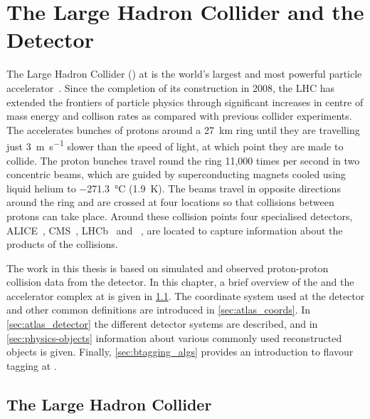 \chapter{The Large Hadron Collider and the \ATLAS Detector}\label{chap:lhc_atlas}

The Large Hadron Collider (\LHC) at \CERN is the world's largest and most powerful particle accelerator~\cite{Evans:2008zzb}.
Since the completion of its construction in 2008, the LHC has extended the frontiers of particle physics through significant increases in centre of mass energy and collison rates as compared with previous collider experiments.
The \LHC accelerates bunches of protons around a \SI{27}{\km} ring until they are travelling just \SI{3}{\m\per\s} slower than the speed of light, at which point they are made to collide.
The proton bunches travel round the ring 11,000 times per second in two concentric beams, which are guided by superconducting magnets cooled using liquid helium to \SI{-271.3}{\degreeCelsius} (\SI{1.9}{\kelvin}).
The beams travel in opposite directions around the ring and are crossed at four locations so that collisions between protons can take place.
Around these collision points four specialised detectors, ALICE~\cite{AliceCollaboration_2008}, CMS~\cite{CMS-TDR-08-001}, LHCb~\cite{LHCbCollaboration_2008} and \ATLAS~\cite{PERF-2007-01}, are located to capture information about the products of the collisions.

The work in this thesis is based on simulated and observed proton-proton collision data from the \ATLAS detector.
In this chapter, a brief overview of the \LHC and the accelerator complex at \CERN is given in \cref{sec:lhc}.
The coordinate system used at the \ATLAS detector and other common definitions are introduced in \cref{sec:atlas_coords}.
In \cref{sec:atlas_detector} the different \ATLAS detector systems are described, and in \cref{sec:physics-objects} information about various commonly used reconstructed objects is given.
Finally, \cref{sec:btagging_algs} provides an introduction to flavour tagging at \ATLAS.


\section{The Large Hadron Collider}\label{sec:lhc}

